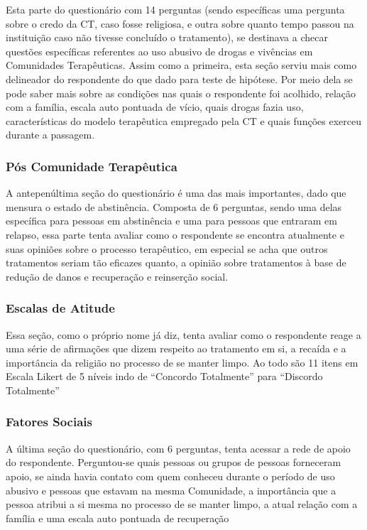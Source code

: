 \documentclass[
	12pt,				%
	oneside,			%
	a4paper,			%
	sumario=tradicional,
	english,			%
	brazil				%
	]{abntex2}
\begin{document}
Esta parte do questionário com 14 perguntas (sendo específicas uma pergunta sobre o credo da CT, caso fosse religiosa, e outra sobre quanto tempo passou na instituição caso não tivesse concluído o tratamento), se destinava a checar questões específicas referentes ao uso abusivo de drogas e vivências em Comunidades Terapêuticas. Assim como a primeira, esta seção serviu mais como delineador do respondente do que dado para teste de hipótese. Por meio dela se pode saber mais sobre as condições nas quais o respondente foi acolhido, relação com a família, escala auto pontuada de vício, quais drogas fazia uso, características do modelo terapêutica empregado pela CT e quais funções exerceu durante a passagem.

\hypertarget{puxf3s-comunidade-terapuxeautica}{%
\subsubsection{Pós Comunidade Terapêutica}\label{puxf3s-comunidade-terapuxeautica}}

A antepenúltima seção do questionário é uma das mais importantes, dado que mensura o estado de abstinência. Composta de 6 perguntas, sendo uma delas específica para pessoas em abstinência e uma para pessoas que entraram em relapso, essa parte tenta avaliar como o respondente se encontra atualmente e suas opiniões sobre o processo terapêutico, em especial se acha que outros tratamentos seriam tão eficazes quanto, a opinião sobre tratamentos à base de redução de danos e recuperação e reinserção social.

\hypertarget{escalas-de-atitude}{%
\subsubsection{Escalas de Atitude}\label{escalas-de-atitude}}

Essa seção, como o próprio nome já diz, tenta avaliar como o respondente reage a uma série de afirmações que dizem respeito ao tratamento em si, a recaída e a importância da religião no processo de se manter limpo. Ao todo são 11 itens em Escala Likert de 5 níveis indo de ``Concordo Totalmente'' para ``Discordo Totalmente''

\hypertarget{fatores-sociais}{%
\subsubsection{Fatores Sociais}\label{fatores-sociais}}

A última seção do questionário, com 6 perguntas, tenta acessar a rede de apoio do respondente. Perguntou-se quais pessoas ou grupos de pessoas forneceram apoio, se ainda havia contato com quem conheceu durante o período de uso abusivo e pessoas que estavam na mesma Comunidade, a importância que a pessoa atribui a si mesma no processo de se manter limpo, a atual relação com a família e uma escala auto pontuada de recuperação
\end{document}
